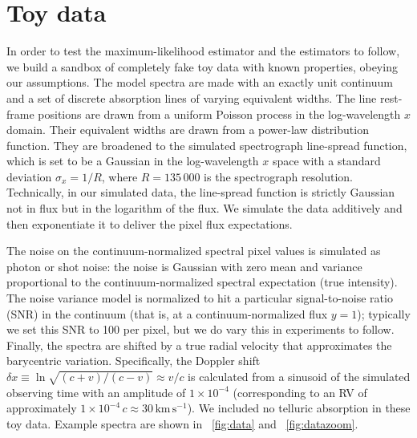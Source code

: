 \documentclass[modern]{aastex631}
\newcommand{\unit}[1]{\mathrm{#1}}
\newcommand{\km}{\unit{km}}
\newcommand{\s}{\unit{s}}
\newcommand{\kmps}{\km\,\s^{-1}}
\newcommand{\figref}[1]{\figurename~\ref{#1}}
\begin{document}
\section{Toy data}\label{sec:data}

In order to test the maximum-likelihood estimator and the estimators to follow, we build a sandbox of completely fake toy data with known properties, obeying our assumptions. 
The model spectra are made with an exactly unit continuum and a set of discrete absorption lines of varying equivalent widths. 
The line rest-frame positions are drawn from a uniform Poisson process in the log-wavelength $x$ domain.
Their equivalent widths are drawn from a power-law distribution function. 
They are broadened to the simulated spectrograph line-spread function, which is set to be a Gaussian in the log-wavelength $x$ space with a standard deviation $\sigma_x=1/R$, where $R=135\,000$ is the spectrograph resolution.
Technically, in our simulated data, the line-spread function is strictly Gaussian not in flux but in the logarithm of the flux.
We simulate the data additively and then exponentiate it to deliver the pixel flux expectations.

The noise on the continuum-normalized spectral pixel values is simulated as photon or shot noise: the noise is Gaussian with zero mean and variance proportional to the continuum-normalized spectral expectation (true intensity).
The noise variance model is normalized to hit a particular signal-to-noise ratio (SNR) in the continuum (that is, at a continuum-normalized flux $y=1$); typically we set this SNR to 100 per pixel, but we do vary this in experiments to follow. 
Finally, the spectra are shifted by a true radial velocity that approximates the barycentric variation. 
Specifically, the Doppler shift $\delta x\equiv\ln\sqrt{(c+v)/(c-v)}\approx v/c$ is calculated from a sinusoid of the simulated observing time with an amplitude of $1\times10^{-4}$ (corresponding to an RV of approximately $1\times 10^{-4}\,c\approx 30\,\kmps$).
We included no telluric absorption in these toy data.
Example spectra are shown in \figref{fig:data} and \figref{fig:datazoom}.
\end{document}
